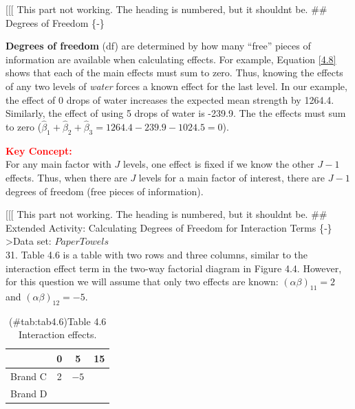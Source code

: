 \documentclass[
]{report}
\begin{document}
{[}{[}{[} This part not working. The heading is numbered, but it shouldnt be.
\#\# Degrees of Freedom \{‑\}

\textbf{Degrees of freedom} (df) are determined by how many ``free'' pieces of information are available when calculating effects. For example, Equation \ref{4.8} shows that each of the main effects must sum to zero. Thus, knowing the effects of any two levels of \emph{water} forces a known effect for the last level. In our example, the effect of 0 drops of water increases the expected mean strength by 1264.4. Similarly, the effect of using 5 drops of water is -239.9. The the effects must sum to zero (\(\hat{\beta}_1 + \hat{\beta}_2 + \hat{\beta}_3 = 1264.4 - 239.9 - 1024.5 = 0\)).

\large

\textbf{\textcolor{red}{Key Concept:}}\\
\color{red}
For any main factor with \(J\) levels, one effect is fixed if we know the other \(J-1\) effects. Thus, when there are \(J\) levels for a main factor of interest, there are \(J-1\) degrees of freedom (free pieces of information).
\color{red}
\normalsize

{[}{[}{[} This part not working. The heading is numbered, but it shouldnt be.
\#\# Extended Activity: Calculating Degrees of Freedom for Interaction Terms \{‑\}
\textgreater Data set: \(PaperTowels\)\\
31. Table 4.6 is a table with two rows and three columns, similar to the interaction effect term in the two-way factorial diagram in Figure 4.4. However, for this question we will assume that only two effects are known: \((\alpha\beta)_{11} = 2\) and \((\alpha\beta)_{12} = -5\).

\begin{table}[!h]
\centering
\caption{(\#tab:tab4.6)Table 4.6 Interaction effects.}
\centering
\begin{tabular}[t]{lccc}
\toprule
  & 0 & 5 & 15\\
\midrule
Brand C & 2 & $-5$ & \\
Brand D &  &  & \\
\bottomrule
\end{tabular}
\end{table}
\end{document}

